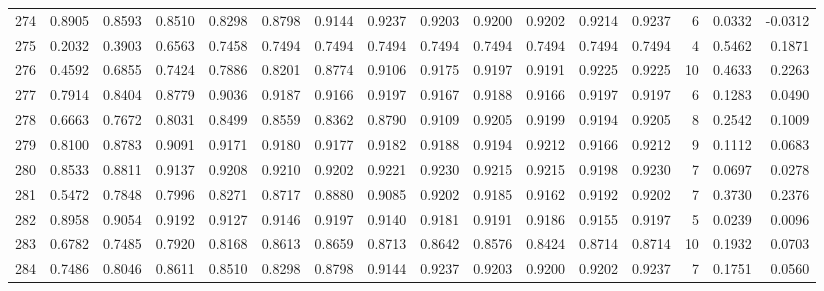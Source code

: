 \begin{tabular}{lrrrrrrrrrrrrrrr}
274 &      0.8905 &  0.8593 &  0.8510 &  0.8298 &  0.8798 &  0.9144 &  0.9237 &  0.9203 &  0.9200 &  0.9202 &   0.9214 &     0.9237 &      6 &                    0.0332 &                    -0.0312 \\
275 &      0.2032 &  0.3903 &  0.6563 &  0.7458 &  0.7494 &  0.7494 &  0.7494 &  0.7494 &  0.7494 &  0.7494 &   0.7494 &     0.7494 &      4 &                    0.5462 &                     0.1871 \\
276 &      0.4592 &  0.6855 &  0.7424 &  0.7886 &  0.8201 &  0.8774 &  0.9106 &  0.9175 &  0.9197 &  0.9191 &   0.9225 &     0.9225 &     10 &                    0.4633 &                     0.2263 \\
277 &      0.7914 &  0.8404 &  0.8779 &  0.9036 &  0.9187 &  0.9166 &  0.9197 &  0.9167 &  0.9188 &  0.9166 &   0.9197 &     0.9197 &      6 &                    0.1283 &                     0.0490 \\
278 &      0.6663 &  0.7672 &  0.8031 &  0.8499 &  0.8559 &  0.8362 &  0.8790 &  0.9109 &  0.9205 &  0.9199 &   0.9194 &     0.9205 &      8 &                    0.2542 &                     0.1009 \\
279 &      0.8100 &  0.8783 &  0.9091 &  0.9171 &  0.9180 &  0.9177 &  0.9182 &  0.9188 &  0.9194 &  0.9212 &   0.9166 &     0.9212 &      9 &                    0.1112 &                     0.0683 \\
280 &      0.8533 &  0.8811 &  0.9137 &  0.9208 &  0.9210 &  0.9202 &  0.9221 &  0.9230 &  0.9215 &  0.9215 &   0.9198 &     0.9230 &      7 &                    0.0697 &                     0.0278 \\
281 &      0.5472 &  0.7848 &  0.7996 &  0.8271 &  0.8717 &  0.8880 &  0.9085 &  0.9202 &  0.9185 &  0.9162 &   0.9192 &     0.9202 &      7 &                    0.3730 &                     0.2376 \\
282 &      0.8958 &  0.9054 &  0.9192 &  0.9127 &  0.9146 &  0.9197 &  0.9140 &  0.9181 &  0.9191 &  0.9186 &   0.9155 &     0.9197 &      5 &                    0.0239 &                     0.0096 \\
283 &      0.6782 &  0.7485 &  0.7920 &  0.8168 &  0.8613 &  0.8659 &  0.8713 &  0.8642 &  0.8576 &  0.8424 &   0.8714 &     0.8714 &     10 &                    0.1932 &                     0.0703 \\
284 &      0.7486 &  0.8046 &  0.8611 &  0.8510 &  0.8298 &  0.8798 &  0.9144 &  0.9237 &  0.9203 &  0.9200 &   0.9202 &     0.9237 &      7 &                    0.1751 &                     0.0560 \\

\end{tabular}
